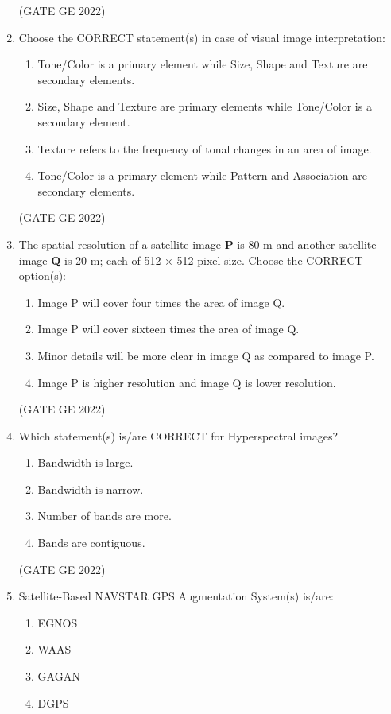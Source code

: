 \documentclass[a4paper, 11pt]{article}
\begin{document}
\begin{enumerate}
\hfill (GATE GE 2022)

\item Choose the CORRECT statement(s) in case of visual image interpretation:
\begin{enumerate}
    \item Tone/Color is a primary element while Size, Shape and Texture are secondary elements.
    \item Size, Shape and Texture are primary elements while Tone/Color is a secondary element.
    \item Texture refers to the frequency of tonal changes in an area of image.
    \item Tone/Color is a primary element while Pattern and Association are secondary elements.
\end{enumerate}

\hfill (GATE GE 2022)

\item The spatial resolution of a satellite image \textbf{P} is 80 m and another satellite image \textbf{Q} is 20 m; each of 512 × 512 pixel size. Choose the CORRECT option(s):
\begin{enumerate}
    \item Image P will cover four times the area of image Q.
    \item Image P will cover sixteen times the area of image Q.
    \item Minor details will be more clear in image Q as compared to image P.
    \item Image P is higher resolution and image Q is lower resolution.
\end{enumerate}

\hfill (GATE GE 2022)

\item Which statement(s) is/are CORRECT for Hyperspectral images?
\begin{enumerate}
    \item Bandwidth is large.
    \item Bandwidth is narrow.
    \item Number of bands are more.
    \item Bands are contiguous.
\end{enumerate}

\hfill (GATE GE 2022)

\item Satellite-Based NAVSTAR GPS Augmentation System(s) is/are:
\begin{enumerate}
    \item EGNOS
    \item WAAS
    \item GAGAN
    \item DGPS
\end{enumerate}


\end{enumerate}
\end{document}
